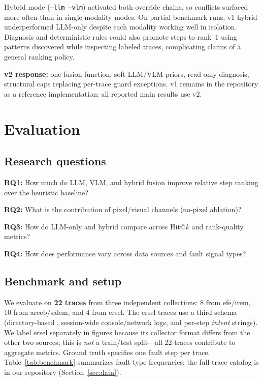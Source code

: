 \documentclass[sigconf,nonacm]{acmart}
\begin{document}
Hybrid mode (\texttt{--llm --vlm}) activated both override chains, so conflicts surfaced more often than in single-modality modes.
On partial benchmark runs, v1 hybrid underperformed LLM-only despite each modality working well in isolation.
Diagnosis and deterministic rules could also promote steps to rank~1 using patterns discovered while inspecting labeled traces, complicating claims of a general ranking policy.

\textbf{v2 response:} one fusion function, soft LLM/VLM priors, read-only diagnosis, structural caps replacing per-trace guard exceptions.
v1 remains in the repository as a reference implementation; all reported main results use v2.

\section{Evaluation}
\label{sec:eval}

\subsection{Research questions}

\textbf{RQ1:} How much do LLM, VLM, and hybrid fusion improve relative step ranking over the heuristic baseline?

\textbf{RQ2:} What is the contribution of pixel/visual channels (no-pixel ablation)?

\textbf{RQ3:} How do LLM-only and hybrid compare across Hit@$k$ and rank-quality metrics?

\textbf{RQ4:} How does performance vary across data sources and fault signal types?

\subsection{Benchmark and setup}

We evaluate on \textbf{22 traces} from three independent collections: 8 from efe/irem, 10 from areeb/salem, and 4 from ersel.
The ersel traces use a third schema (directory-based , session-wide console/network logs, and per-step \emph{intent} strings).
We label ersel separately in figures because its collector format differs from the other two sources; this is \emph{not} a train/test split---all 22 traces contribute to aggregate metrics.
Ground truth specifies one fault step per trace.
Table~\ref{tab:benchmark} summarizes fault-type frequencies; the full trace catalog is in our repository (Section~\ref{sec:data}).
\end{document}

